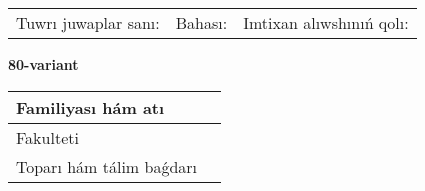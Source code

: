 \documentclass{article}
\begin{document}
\vspace{1cm}

\begin{tabular}{lll}
Tuwrı juwaplar sanı: \underline{\hspace{1.5cm}} & 
Bahası: \underline{\hspace{1.5cm}} & 
Imtixan alıwshınıń qolı: \underline{\hspace{2cm}} \\
\end{tabular}

\egroup

\newpage


\textbf{80-variant}\\

\bgroup
\def\arraystretch{1.6} %

\begin{tabular}{|m{5.7cm}|m{9.5cm}|}
\hline
Familiyası hám atı & \\
\hline
Fakulteti  & \\
\hline
Toparı hám tálim baǵdarı  & \\
\hline
\end{tabular}

\vspace{1cm}
\end{document}
